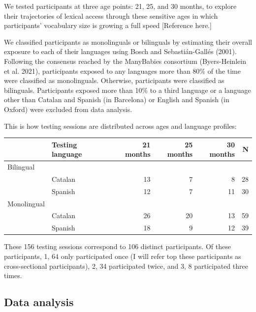 \documentclass[
]{article}
\begin{document}
We tested participants at three age points: 21, 25, and 30 months, to
explore their trajectories of lexical access through these sensitive
ages in which participants' vocabulary size is growing a full speed
{[}Reference here.{]}

We classified participants as monolinguals or bilinguals by estimating
their overall exposure to each of their languages using Bosch and
Sebastián-Gallés (2001). Following the consensus reached by the
ManyBabies consortium (Byers-Heinlein et al. 2021), participants exposed
to any languages more than 80\% of the time were classified as
monolinguals. Otherwise, participants were classified as bilinguals.
Participants exposed more than 10\% to a third language or a language
other than Catalan and Spanish (in Barcelona) or English and Spanish (in
Oxford) were excluded from data analysis.

This is how testing sessions are distributed across ages and language
profiles:

\captionsetup[table]{labelformat=empty,skip=1pt}
\begin{longtable}{llrrrr}
\toprule
 & Testing language & 21 months & 25 months & 30 months & N \\ 
\midrule
\multicolumn{1}{l}{Bilingual} \\ 
\midrule
 & Catalan & 13 & 7 & 8 & 28 \\ 
 & Spanish & 12 & 7 & 11 & 30 \\ 
\midrule
\multicolumn{1}{l}{Monolingual} \\ 
\midrule
 & Catalan & 26 & 20 & 13 & 59 \\ 
 & Spanish & 18 & 9 & 12 & 39 \\ 
\bottomrule
\end{longtable}

These 156 testing sessions correspond to 106 distinct participants. Of
these participants, 1, 64 only participated once (I will refer top these
participants as cross-sectional participants), 2, 34 participated twice,
and 3, 8 participated three times.

\hypertarget{data-analysis}{%
\subsection{Data analysis}\label{data-analysis}}
\end{document}
